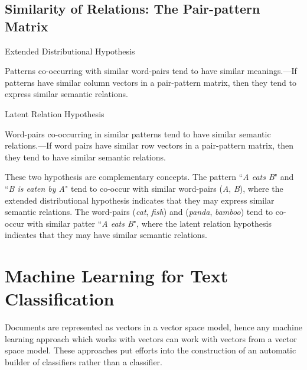 \subsection{Similarity of Relations: The Pair-pattern Matrix}
\begin{hypothesis}{Extended Distributional Hypothesis}{}
\par Patterns co-occurring with similar word-pairs tend to have similar meanings\cite{lin2001vsmh3}.---If patterns have similar column vectors in a pair-pattern matrix, then they tend to express similar semantic relations.
\end{hypothesis}
\begin{hypothesis}{Latent Relation Hypothesis}{}
\par Word-pairs co-occurring in similar patterns tend to have similar semantic relations\cite{turney2003vsmh4}.---If word pairs have similar row vectors in a pair-pattern matrix, then they tend to have similar semantic relations.
\end{hypothesis}
\par These two hypothesis are complementary concepts. The pattern ``\textsl{A eats B}" and ``\textsl{B is eaten by A}" tend to co-occur with similar word-pairs (\textsl{A}, \textsl{B}), where the extended distributional hypothesis indicates that they  may express similar semantic relations. The word-pairs (\textsl{cat}, \textsl{fish}) and (\textsl{panda}, \textsl{bamboo}) tend to co-occur with similar patter ``\textsl{A eats B}", where the latent relation hypothesis indicates that they may have similar semantic relations.


\section{Machine Learning for Text Classification}\label{sec:ml}
\par Documents are represented as vectors in a vector space model, hence any machine learning approach which works with vectors can work with vectors from a vector space model\cite{witten2016ml}. These approaches put efforts into the construction of an automatic builder of classifiers rather than a classifier\cite{sebastiani2002tc}.


